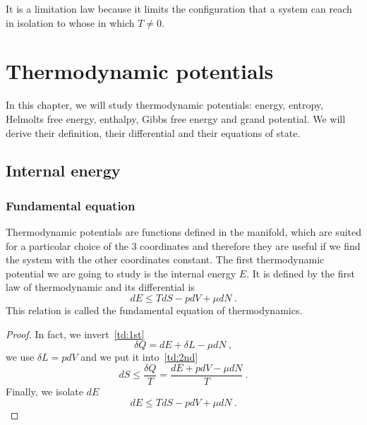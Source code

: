     It is a limitation law because it limits the configuration that a system can reach in isolation to whose in which $T \neq 0$.

\chapter{Thermodynamic potentials}

    In this chapter, we will study thermodynamic potentials: energy, entropy, Helmolts free energy, enthalpy, Gibbs free energy and grand potential. We will derive their definition, their differential and their equations of state.

\section{Internal energy}

\subsection{Fundamental equation}

    Thermodynamic potentials are functions defined in the manifold, which are suited for a particolar choice of the $3$ coordinates and therefore they are useful if we find the system with the other coordinates constant. The first thermodynamic potential we are going to study is the internal energy $E$. It is defined by the first law of thermodynamic and its differential is
    \begin{equation}\label{td:d:e}
        dE \leq T dS - pdV + \mu dN ~.
    \end{equation}
    This relation is called the fundamental equation of thermodynamics.
    \begin{proof}
        In fact, we invert~\eqref{td:1st}
        \begin{equation*}
            \delta Q = dE + \delta L - \mu dN ~,
        \end{equation*}
        we use $\delta L = p dV$ and we put it into~\eqref{td:2nd}
        \begin{equation}
            dS \leq \frac{\delta Q}{T} = \frac{dE + p dV - \mu dN}{T} ~.
        \end{equation}
        Finally, we isolate $dE$
        \begin{equation}
            dE \leq TdS - p dV + \mu dN ~.
        \end{equation}
    \end{proof} 

